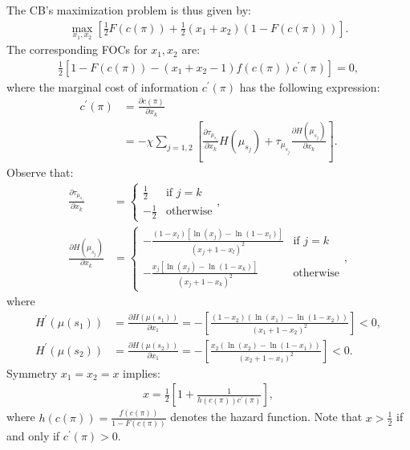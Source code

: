 \documentclass[12pt,a4paper]{article}
\begin{document}
The CB's maximization problem is thus given by:
\begin{align}
    \max_{x_1,x_2} \left[\frac{1}{2}F(c(\pi)) + \frac{1}{2}(x_1+x_2)(1-F(c(\pi)))\right].
\end{align}
The corresponding FOCs for $x_1,x_2$ are:
\begin{align}
    \frac{1}{2}\left[1-F(c(\pi))-(x_1+x_2-1)f(c(\pi))c^\prime(\pi)\right]=0,
\end{align}
where the marginal cost of information $c^\prime(\pi)$ has the following expression:
\begin{align}
    c^\prime(\pi) & =\frac{\partial c(\pi)}{\partial x_k} \\
    & = -\chi \sum_{j=1,2} \left[\frac{\partial \tau_{\mu_{s_j}}}{\partial x_k}H(\mu_{s_j}) + \tau_{\mu_{s_j}}\frac{\partial H(\mu_{s_j})}{\partial x_k}\right].
\end{align}
Observe that:
\begin{align}
    \frac{\partial \tau_{\mu_{s_j}}}{\partial x_k} & = \left\{\begin{array}{ll}
        \frac{1}{2} & \mbox{if } j = k\\
        -\frac{1}{2} & \mbox{otherwise}
        \end{array}\right., \\
    \frac{\partial H(\mu_{s_j})}{\partial x_k} & = \left\{\begin{array}{ll}
        -\frac{(1-x_l)[\ln(x_j)-\ln(1-x_l)]}{(x_j+1-x_l)^2} & \mbox{if } j = k\\
        -\frac{x_j[\ln(x_j)-\ln(1-x_k)]}{(x_j+1-x_k)^2} & \mbox{otherwise}
        \end{array}\right.,
\end{align}
where 
\begin{align}
    H^\prime(\mu(s_1)) & =\frac{\partial H(\mu(s_1))}{\partial x_1}=-\left[\frac{(1-x_2)(\ln(x_1)-\ln(1-x_2))}{(x_1+1-x_2)^2}\right]<0, \\
    H^\prime(\mu(s_2)) & =\frac{\partial H(\mu(s_2))}{\partial x_1}=-\left[\frac{x_2(\ln(x_2)-\ln(1-x_1))}{(x_2+1-x_1)^2}\right]<0.
\end{align}
Symmetry $x_1=x_2=x$ implies:
\begin{align}
    x=\frac{1}{2}\left[1+\frac{1}{h(c(\pi))c^\prime(\pi)}\right],
\end{align}
where $h(c(\pi))=\frac{f(c(\pi))}{1-F(c(\pi))}$ denotes the hazard function. Note that $x>\frac{1}{2}$ if and only if $c^\prime(\pi)>0$. 
\end{document}
